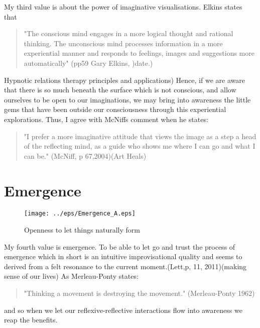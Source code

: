 
My third value is about the power of imaginative visualisations. Elkins states that \begin{quote}
"The conscious mind engages in a more logical thought and rational thinking. The unconscious mind processes information in a more experiential manner and responds to feelings, images and suggestions more automatically" (pp59 Gary Elkins, )date.)
\end{quote}



Hypnotic relations therapy principles and applications) Hence, if we are aware that there is so much beneath the surface which is not conscious, and allow ourselves to be open to our imaginations, we may bring into awareness the little gems that have been outside our consciousness through this experiential explorations. Thus, I agree with McNiffs comment when he states: 

\begin{quote}
"I prefer a more imaginative attitude that views the image as a step a head of the reflecting mind, as a guide who shows me where I can go and what I can be." (McNiff, p 67,2004)(Art Heals) 
\end{quote}

\newpage
\section{Emergence}


\begin{figure}[!h]
\begin{center}
\texttt{[image: ../eps/Emergence\_A.eps]} 
\caption{Openness to let things naturally form }
\label{Emergence}
\end{center}
\end{figure}


My fourth value is emergence. To be able to let go and trust the process of emergence which in short is an intuitive improvisational quality and seems to derived from a felt resonance to the current moment.(Lett,p, 11, 2011)(making sense of our lives) As Merleau-Ponty states: 
\begin{quote}
"Thinking a movement is destroying the movement." (Merleau-Ponty 1962)
\end{quote}
 and so when we let our reflexive-reflective interactions flow into awareness we reap the benefits.






